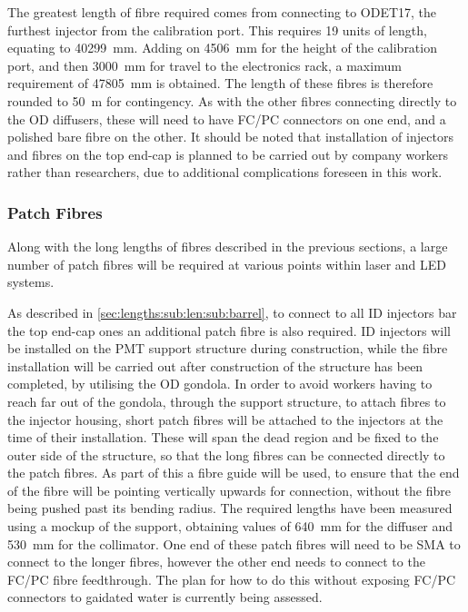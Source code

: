 \documentclass[a4paper,11pt]{article}
\begin{document}
The greatest length of fibre required comes from connecting to ODET17, the furthest injector from the calibration port. This requires 19 units of length, equating to 40299~mm. Adding on 4506~mm for the height of the calibration port, and then 3000~mm for travel to the electronics rack, a maximum requirement of 47805~mm is obtained. The length of these fibres is therefore rounded to 50~m for contingency. As with the other fibres connecting directly to the OD diffusers, these will need to have FC/PC connectors on one end, and a polished bare fibre on the other. It should be noted that installation of injectors and fibres on the top end-cap is planned to be carried out by company workers rather than researchers, due to additional complications foreseen in this work.


\subsubsection{Patch Fibres}\label{sec:lengths:sub:len:sub:patch}

Along with the long lengths of fibres described in the previous sections, a large number of patch fibres will be required at various points within laser and LED systems.

As described in \cref{sec:lengths:sub:len:sub:barrel}, to connect to all ID injectors bar the top end-cap ones an additional patch fibre is also required. ID injectors will be installed on the PMT support structure during construction, while the fibre installation will be carried out after construction of the structure has been completed, by utilising the OD gondola. In order to avoid workers having to reach far out of the gondola, through the support structure, to attach fibres to the injector housing, short patch fibres will be attached to the injectors at the time of their installation. These will span the dead region and be fixed to the outer side of the structure, so that the long fibres can be connected directly to the patch fibres. As part of this a fibre guide will be used, to ensure that the end of the fibre will be pointing vertically upwards for connection, without the fibre being pushed past its bending radius. The required lengths have been measured using a mockup of the support, obtaining values of 640~mm for the diffuser and 530~mm for the collimator. One end of these patch fibres will need to be SMA to connect to the longer fibres, however the other end needs to connect to the FC/PC fibre feedthrough. The plan for how to do this without exposing FC/PC connectors to gaidated water is currently being assessed.
\end{document}
